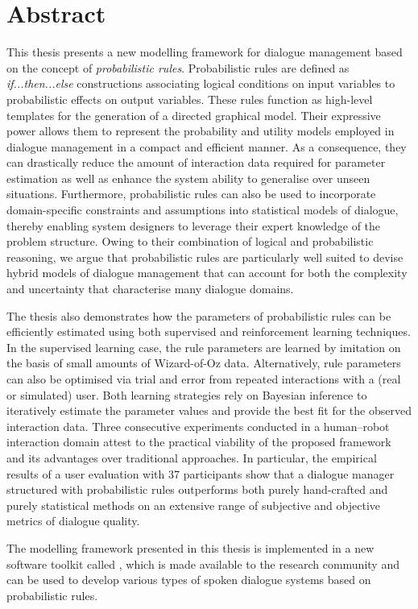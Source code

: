 \chapter*{Abstract}

This thesis presents a new modelling framework for dialogue management based on the concept of \textit{probabilistic rules}.  Probabilistic rules are defined as \textit{if...then...else} constructions associating logical conditions on input variables to probabilistic effects on output variables.  These rules function as high-level templates for the generation of a directed graphical model. Their expressive power allows them to represent the probability and utility models employed in dialogue management in a compact and efficient manner. As a consequence, they can drastically reduce the amount of interaction data required for parameter estimation as well as enhance the system ability to generalise over unseen situations. Furthermore, probabilistic rules can also be used to incorporate domain-specific constraints and assumptions into statistical models of dialogue, thereby enabling system designers to leverage their expert knowledge of the problem structure.  Owing to their combination  of logical and probabilistic reasoning, we argue that probabilistic rules are particularly well suited to devise hybrid models of dialogue management that can account for both the complexity and uncertainty that characterise many dialogue domains.


The thesis also demonstrates how the parameters of probabilistic rules can be efficiently estimated using both supervised and reinforcement learning techniques. In the supervised learning case, the rule parameters are learned by imitation on the basis of small amounts of Wizard-of-Oz data.  Alternatively, rule parameters can also be optimised via trial and error from repeated interactions with a (real or simulated) 
user. Both learning strategies rely on Bayesian inference to iteratively estimate the parameter values and provide the best fit for the observed interaction data. Three consecutive experiments conducted in a human--robot interaction domain attest to the practical viability of the proposed framework and its advantages over traditional approaches.  In particular, the empirical results of a user evaluation with 37 participants show that a dialogue manager structured with probabilistic rules outperforms both purely hand-crafted and purely statistical methods on an extensive range of subjective and objective metrics of dialogue quality.

The modelling framework presented in this thesis is implemented in a new software toolkit called \opendial{}, which is made available to the research community and can be used to develop various types of spoken dialogue systems based on probabilistic rules. 
